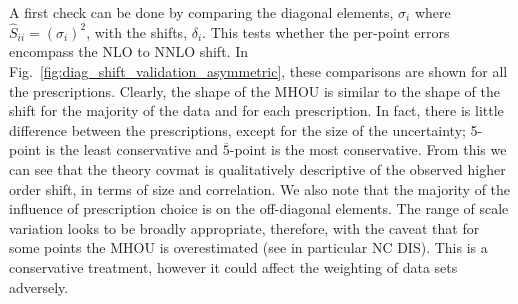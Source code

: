 A first check can be done by comparing the diagonal elements, $\sigma_i$ where $\widehat{S}_{ii} = (\sigma_i)^2$, with the shifts, $\delta_i$. This tests whether the per-point errors encompass the NLO to NNLO shift. In Fig.~\ref{fig:diag_shift_validation_asymmetric}, these comparisons are shown for all the prescriptions. Clearly, the shape of the MHOU is similar to the shape of the shift for the majority of the data and for each prescription. In fact, there is little difference between the prescriptions, except for the size of the uncertainty; 5-point is the least conservative and $\overline{5}$-point is the most conservative. From this we can see that the theory covmat is qualitatively descriptive of the observed higher order shift, in terms of size and correlation. We also note that the majority of the influence of prescription choice is on the off-diagonal elements. The range of scale variation looks to be broadly appropriate, therefore, with the caveat that for some points the MHOU is overestimated (see in particular NC DIS). This is a conservative treatment, however it could affect the weighting of data sets adversely.
